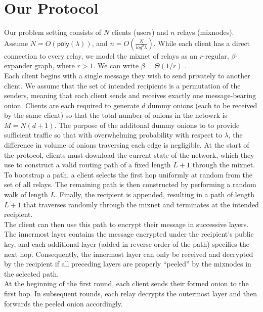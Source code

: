 \section{Our Protocol}

Our problem setting consists of $N$ clients (users) and $n$ relays (mixnodes). Assume $N = O(\mathsf{poly}(\lambda))$, and $n = O(\frac{N}{log^2 \lambda})$. While each client has a direct connection to every relay, we model the mixnet of relays as an $r$-regular, $\beta$-expander graph, where $r > 1$. We can write $\beta = \Theta(1/r)$ \cite[Section 2.3]{Hoory2006}.\\

Each client begins with a single message they wish to send privately to another client. We assume that the set of intended recipients is a permutation of the senders, meaning that each client sends and receives exactly one message-bearing onion. Clients are each required to generate $d$ dummy onions (each to be received by the same client) so that the total number of onions in the netowrk is $M = N(d + 1)$. The purpose of the additonal dummy onions to to provide sufficient traffic so that with overwhelming probability with respect to $\lambda$, the difference in volume of onions traversing each edge is negligible. At the start of the protocol, clients must download the current state of the network, which they use to construct a valid routing path of a fixed length $L + 1$ through the mixnet. To bootstrap a path, a client selects the first hop uniformly at random from the set of all relays. The remaining path is then constructed by performing a random walk of length $L$. Finally, the recipient is appended, resulting in a path of length $L + 1$ that traverses randomly through the mixnet and terminates at the intended recipient.\\

The client can then use this path to encrypt their message in successive layers. The innermost layer contains the message encrypted under the recipient’s public key, and each additional layer (added in reverse order of the path) specifies the next hop. Consequently, the innermost layer can only be received and decrypted by the recipient if all preceding layers are properly ``peeled'' by the mixnodes in the selected path.\\

At the beginning of the first round, each client sends their formed onion to the first hop. In subsequent rounds, each relay decrypts the outermost layer and then forwards the peeled onion accordingly.\\


